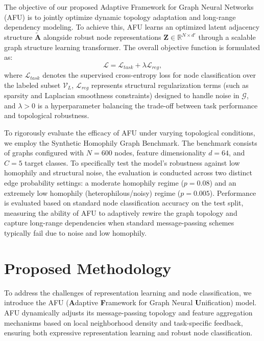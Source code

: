 \documentclass[10pt,twocolumn]{article}
\begin{document}
The objective of our proposed Adaptive Framework for Graph Neural Networks (\textsc{AFU}) is to jointly optimize dynamic topology adaptation and long-range dependency modeling. To achieve this, \textsc{AFU} learns an optimized latent adjacency structure $\tilde{\mathbf{A}}$ alongside robust node representations $\mathbf{Z} \in \mathbb{R}^{N \times d'}$ through a scalable graph structure learning transformer. The overall objective function is formulated as:
\begin{equation}
\mathcal{L} = \mathcal{L}_{task} + \lambda \mathcal{L}_{reg},
\end{equation}
where $\mathcal{L}_{task}$ denotes the supervised cross-entropy loss for node classification over the labeled subset $\mathcal{V}_L$, $\mathcal{L}_{reg}$ represents structural regularization terms (such as sparsity and Laplacian smoothness constraints) designed to handle noise in $\mathcal{G}$, and $\lambda > 0$ is a hyperparameter balancing the trade-off between task performance and topological robustness.

To rigorously evaluate the efficacy of \textsc{AFU} under varying topological conditions, we employ the Synthetic Homophily Graph Benchmark. The benchmark consists of graphs configured with $N = 600$ nodes, feature dimensionality $d = 64$, and $C = 5$ target classes. To specifically test the model's robustness against low homophily and structural noise, the evaluation is conducted across two distinct edge probability settings: a moderate homophily regime ($p = 0.08$) and an extremely low homophily (heterophilous/noisy) regime ($p = 0.005$). Performance is evaluated based on standard node classification accuracy on the test split, measuring the ability of \textsc{AFU} to adaptively rewire the graph topology and capture long-range dependencies when standard message-passing schemes typically fail due to noise and low homophily.

\section{Proposed Methodology}
To address the challenges of representation learning and node classification, we introduce the \textsc{AFU} (\textbf{A}daptive \textbf{F}ramework for Graph Neural \textbf{U}nification) model. \textsc{AFU} dynamically adjusts its message-passing topology and feature aggregation mechanisms based on local neighborhood density and task-specific feedback, ensuring both expressive representation learning and robust node classification.
\end{document}
